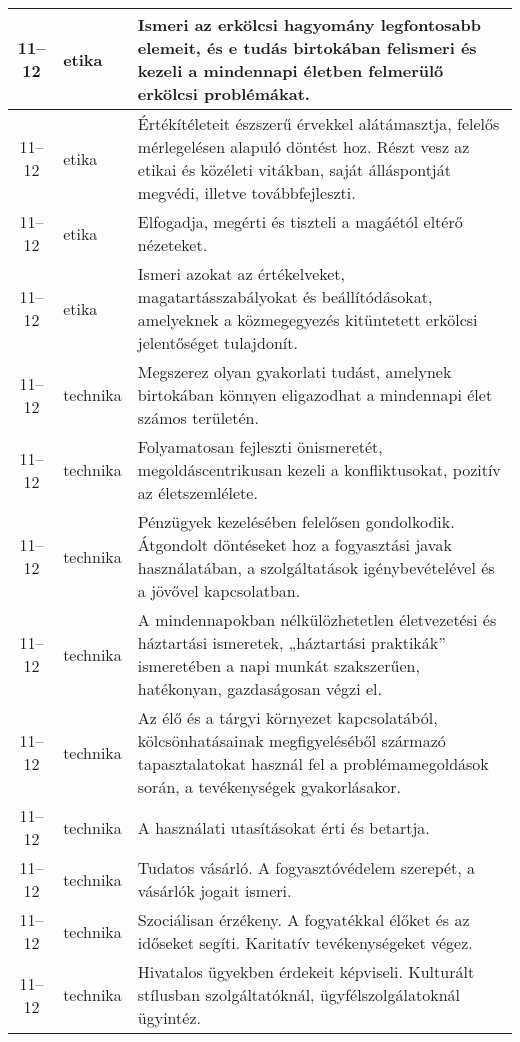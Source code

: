 \begin{small}
\begin{longtable}{c | p{2cm} |  p{11cm} }
              11--12 & etika & Ismeri az erkölcsi hagyomány legfontosabb elemeit, és e tudás birtokában felismeri és kezeli a mindennapi életben felmerülő erkölcsi problémákat. \\ \hline
              11--12 & etika & Értékítéleteit észszerű érvekkel alátámasztja, felelős mérlegelésen alapuló döntést hoz. Részt vesz az etikai és közéleti vitákban, saját álláspontját megvédi, illetve továbbfejleszti. \\ \hline
              11--12 & etika & Elfogadja, megérti és tiszteli a magáétól eltérő nézeteket. \\ \hline
              11--12 & etika & Ismeri azokat az értékelveket, magatartásszabályokat és beállítódásokat, amelyeknek a közmegegyezés kitüntetett erkölcsi jelentőséget tulajdonít. \\ \hline
              11--12 & technika & Megszerez olyan gyakorlati tudást, amelynek birtokában könnyen eligazodhat a mindennapi élet számos területén. \\ \hline
              11--12 & technika & Folyamatosan fejleszti önismeretét, megoldáscentrikusan kezeli a konfliktusokat,  pozitív az életszemlélete. \\ \hline
              11--12 & technika & Pénzügyek kezelésében felelősen gondolkodik. Átgondolt döntéseket hoz a fogyasztási javak használatában, a szolgáltatások igénybevételével és a jövővel kapcsolatban. \\ \hline
              11--12 & technika & A mindennapokban nélkülözhetetlen életvezetési és háztartási ismeretek, „háztartási praktikák” ismeretében a napi munkát szakszerűen, hatékonyan, gazdaságosan végzi el. \\ \hline
              11--12 & technika & Az élő és a tárgyi környezet kapcsolatából, kölcsönhatásainak megfigyeléséből származó tapasztalatokat használ fel a problémamegoldások során, a tevékenységek gyakorlásakor. \\ \hline
              11--12 & technika & A használati utasításokat érti és betartja. \\ \hline
              11--12 & technika & Tudatos vásárló. A fogyasztóvédelem szerepét, a vásárlók jogait ismeri. \\ \hline
              11--12 & technika & Szociálisan érzékeny. A fogyatékkal élőket és az időseket segíti. Karitatív tevékenységeket végez. \\ \hline
              11--12 & technika & Hivatalos ügyekben érdekeit képviseli. Kulturált stílusban szolgáltatóknál, ügyfélszolgálatoknál ügyintéz. \\ \hline

\end{longtable}
\end{small}
